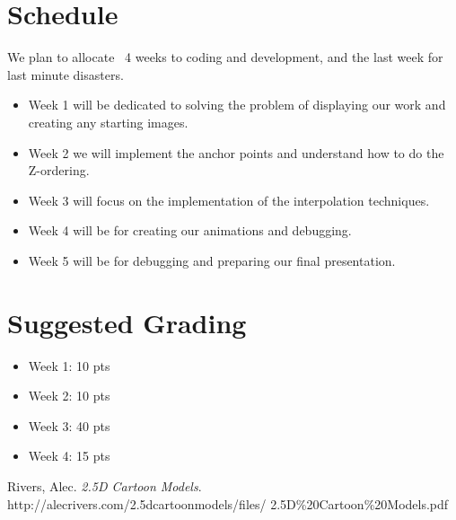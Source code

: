\documentclass[12pt]{article}
\begin{document}
\section*{Schedule}
We plan to allocate ~4 weeks to coding and development, and the last
week for last minute disasters.

\begin{itemize}
\item Week 1 will be dedicated to solving the problem of displaying our work
and creating any starting images.
\item Week 2 we will implement the anchor points and understand how to do
the Z-ordering.
\item Week 3 will focus on the implementation of the interpolation techniques.
\item Week 4 will be for creating our animations and debugging.
\item Week 5 will be for debugging and preparing our final presentation.
\end{itemize}

\section*{Suggested Grading}
\begin{itemize}
\item Week 1: 10 pts
\item Week 2: 10 pts
\item Week 3: 40 pts
\item Week 4: 15 pts
\end{itemize}


\begin{thebibliography}{99}
\singlespacing
{} Rivers, Alec. \emph{2.5D Cartoon Models}. http://alecrivers.com/2.5dcartoonmodels/files/
2.5D\%20Cartoon\%20Models.pdf
\end{thebibliography}
\end{document}
